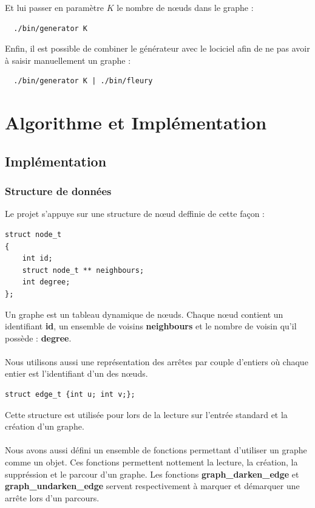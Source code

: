 \documentclass[12pt,a4paper,utf8x]{report}
\begin{document}
  Et lui passer en paramètre $K$ le nombre de nœuds dans le graphe : 

  \begin{lstlisting}
  ./bin/generator K
  \end{lstlisting}

  Enfin, il est possible de combiner le générateur avec le lociciel afin de ne pas avoir à saisir manuellement un graphe : 

  \begin{lstlisting}
  ./bin/generator K | ./bin/fleury
  \end{lstlisting}


\chapter{Algorithme et Implémentation}
  \section{Implémentation}
    \subsection{Structure de données}
    Le projet s'appuye sur une structure de nœud deffinie de cette façon : 
    \begin{lstlisting}
struct node_t
{
    int id;
    struct node_t ** neighbours;
    int degree;
};
    \end{lstlisting} 
    Un graphe est un tableau dynamique de nœuds. Chaque nœud contient un identifiant \textbf{id}, un ensemble de voisins \textbf{neighbours} et le nombre de voisin qu'il possède : \textbf{degree}.\\ \\
    \indent Nous utilisons aussi une représentation des arrêtes par couple d'entiers où chaque entier est l'identifiant d'un des nœuds.
    \begin{lstlisting}
struct edge_t {int u; int v;};
    \end{lstlisting}
    Cette structure est utilisée pour lors de la lecture sur l'entrée standard et la création d'un graphe. \\ \\
    \indent Nous avons aussi défini un ensemble de fonctions permettant d'utiliser un graphe comme un objet. Ces fonctions permettent nottement la lecture, la création, la suppréssion et le parcour d'un graphe. Les fonctions \textbf{graph\_darken\_edge} et \textbf{graph\_undarken\_edge} servent respectivement à marquer et démarquer une arrête lors d'un parcours.
\end{document}
